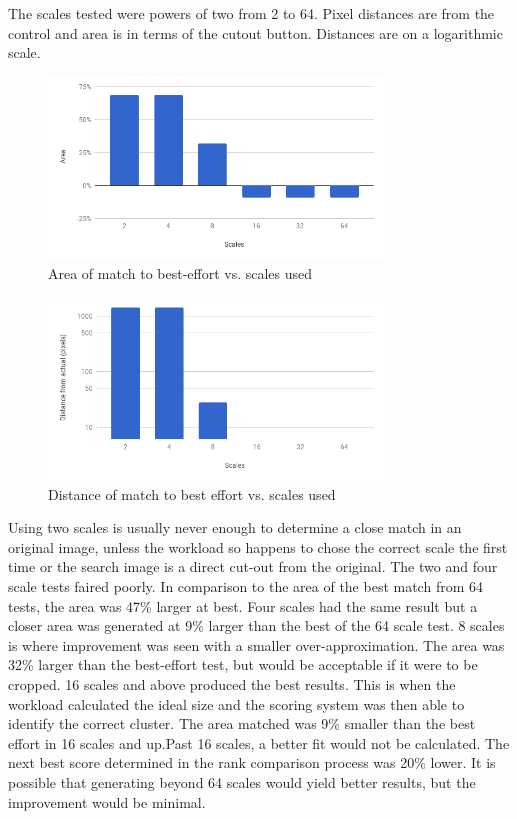 \documentclass[10pt, journal]{vgtc}                %
\newcommand\tab[1][1cm]{\hspace*{#1}}
\begin{document}
\begin{flushleft}
\begin{figure}[h!]
	\end{figure}
	\tab The scales tested were powers of two from 2 to 64. Pixel distances are from the control and area is in terms of the cutout button. Distances are on a logarithmic scale.\\\smallskip
	\begin{figure}[h!]
		\centering
		\includegraphics[width=3.5in]{area.png}
		\caption{Area of match to best-effort vs. scales used}
	\end{figure}
	\begin{figure}[h!]
		\centering
		\includegraphics[width=3.5in]{match_distance.png}
		\caption{Distance of match to best effort vs. scales used}
	\end{figure}
	\tab Using two scales is usually never enough to determine a close match in an original image, unless the workload so happens to chose the correct scale the first time or the search image is a direct cut-out from the original. The two and four scale tests faired poorly. In comparison to the area of the best match from 64 tests, the area was 47\% larger at best. Four scales had the same result but a closer area was generated at 9\% larger than the best of the 64 scale test. 8 scales is where improvement was seen with a smaller over-approximation. The area was 32\% larger than the best-effort test, but would be acceptable if it were to be cropped. 16 scales and above produced the best results. This is when the workload calculated the ideal size and the scoring system was then able to identify the correct cluster. The area matched was 9\% smaller than the best effort in 16 scales and up.Past 16 scales, a better fit would not be calculated. The next best score determined in the rank comparison process was 20\% lower. It is possible that generating beyond 64 scales would yield better results, but the improvement would be minimal.\\

\end{flushleft}
\end{document}
